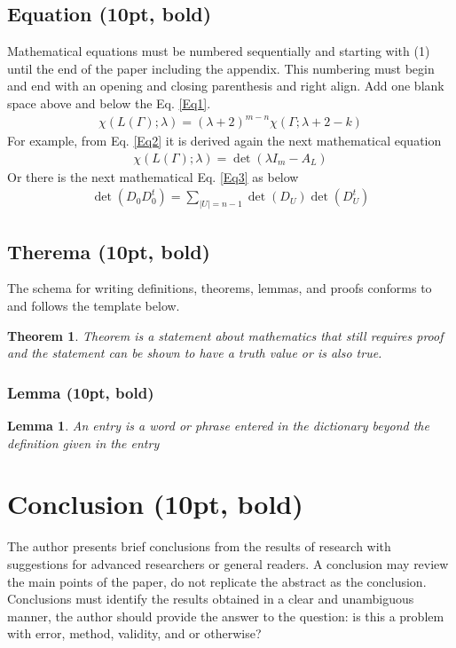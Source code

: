 \documentclass{article}
\newcounter{lemma}
\newtheorem{lemma}{Lemma}
\newcounter{theorem}
\newtheorem{theorem}{Theorem}
\begin{document}
\subsection{Equation (10pt, bold)}
Mathematical equations must be numbered sequentially and starting with (1) until the end of the paper including the appendix. This numbering must begin and end with an opening and closing parenthesis and right align. Add one blank space above and below the Eq. \ref{Eq1}.
\begin{eqnarray}
	\chi(L(\Gamma); \lambda)=(\lambda+2)^{m-n}\chi(\Gamma;\lambda+2-k)
	\label{Eq1}
\end{eqnarray}
For example, from Eq. \ref{Eq2} it is derived again the next mathematical equation
\begin{eqnarray}
	\chi(L(\Gamma); \lambda)=\det (\lambda I_{m}-A_{L})
		\label{Eq2}
\end{eqnarray}
Or there is the next mathematical Eq. \ref{Eq3} as below
\begin{eqnarray}
\det(D_{0}D_{0}^{t})=\sum_{|U|=n-1} \det(D_{U})\det(D_{U}^{t})
	\label{Eq3}
\end{eqnarray}
\subsection{Therema (10pt, bold)}
The schema for writing definitions, theorems, lemmas, and proofs conforms to and follows the template below.

\begin{theorem}
	 Theorem is a statement about mathematics that still requires proof and the statement can be shown to have a truth value or is also true.
\end{theorem}

\subsubsection{Lemma (10pt, bold)}
\begin{lemma}
	An entry is a word or phrase entered in the dictionary beyond the definition given in the entry
\end{lemma}

\section{Conclusion (10pt, bold)}
The author presents brief conclusions from the results of research with suggestions for advanced researchers or general readers. A conclusion may review the main points of the paper, do not replicate the abstract as the conclusion. Conclusions must identify the results obtained in a clear and unambiguous manner, the author should provide the answer to the question: is this a problem with error, method, validity, and or otherwise?
\end{document}
